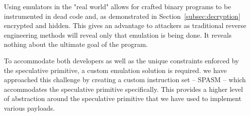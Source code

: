 Using emulators in the "real world" allows for crafted binary programs to be
instrumented in dead code and, as demonstrated in
Section~\ref{subsec:decryption} encrypted and hidden. This gives an advantage to
attackers as traditional reverse engineering methods will reveal only that
emulation is being done. It reveals nothing about the ultimate goal of the
program. 

To accommodate both developers as well as the unique constraints 
enforced by the speculative primitive, a custom emulation solution is required. 
we have approached this challenge by creating a custom instruction set -- 
SPASM -- which accommodates the speculative primitive specifically. This 
provides a higher level of abstraction around the speculative primitive
that we have used to implement various payloads. 


%   


